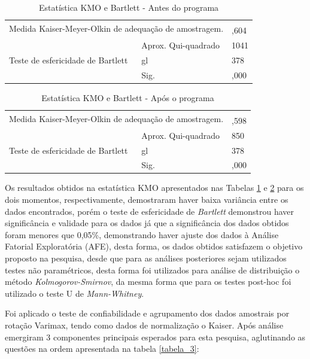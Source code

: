 \begin{table}[H]
\FloatBarrier
\centering
\caption{Estatística KMO e Bartlett - Antes do programa}
\label{tabela_8}
\begin{tabular}{ll|l}
\hline\hline
\multicolumn{2}{l|}{\multirow{2}{*}{Medida Kaiser-Meyer-Olkin de adequação de amostragem.}} &  \\
\multicolumn{2}{l|}{} & ,604 \\ \hline
\multirow{3}{*}{Teste de esfericidade de Bartlett} & Aprox. Qui-quadrado & 1041 \\
 & gl & 378 \\
 & Sig. & ,000 \\ \hline
\end{tabular}
\end{table}

\begin{table}[H]
\FloatBarrier
\centering
\caption{Estatística KMO e Bartlett - Após o programa}
\label{tabela_9}
\begin{tabular}{ll|l}
\hline\hline
\multicolumn{2}{l|}{\multirow{2}{*}{Medida Kaiser-Meyer-Olkin de adequação de amostragem.}} &  \\
\multicolumn{2}{l|}{} & ,598 \\ \hline
\multirow{3}{*}{Teste de esfericidade de Bartlett} & Aprox. Qui-quadrado & 850 \\
 & gl & 378 \\
 & Sig. & ,000 \\ \hline
\end{tabular}
\end{table}

Os resultados obtidos na estatística KMO apresentados nas Tabelas \ref{tabela_8} e \ref{tabela_9} para os dois momentos, respectivamente, demostraram haver baixa variância entre os dados encontrados, porém o teste de esfericidade de \textit{Bartlett} demonstrou haver significância e validade para os dados já que a significância dos dados obtidos foram menores que 0,05\%, demonstrando haver ajuste dos dados à  Análise Fatorial Exploratória (AFE), desta forma, os dados obtidos satisfazem o objetivo proposto na pesquisa, desde que para as análises posteriores sejam utilizados testes não paramétricos, desta forma foi utilizados para análise de distribuição o método \textit{Kolmogorov-Smirnov}, da mesma forma que para os testes post-hoc foi utilizado o teste U de \textit{Mann-Whitney}.

Foi aplicado o teste de confiabilidade e agrupamento dos dados amostrais por rotação Varimax, tendo como dados de normalização o Kaiser\footnotemark[1]. 
Após análise  emergiram 3 componentes principais esperados para esta pesquisa, aglutinando as questões na ordem apresentada na tabela \ref{tabela_3}:



